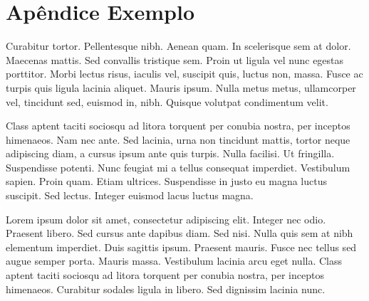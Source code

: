 %
%
% 
%
\chapter{Apêndice Exemplo}
\noindent
Curabitur tortor. Pellentesque nibh. Aenean quam. In scelerisque sem at dolor. Maecenas mattis. Sed convallis tristique sem. Proin ut ligula vel nunc egestas porttitor. Morbi lectus risus, iaculis vel, suscipit quis, luctus non, massa. Fusce ac turpis quis ligula lacinia aliquet. Mauris ipsum. Nulla metus metus, ullamcorper vel, tincidunt sed, euismod in, nibh. Quisque volutpat condimentum velit.

Class aptent taciti sociosqu ad litora torquent per conubia nostra, per inceptos himenaeos. Nam nec ante. Sed lacinia, urna non tincidunt mattis, tortor neque adipiscing diam, a cursus ipsum ante quis turpis. Nulla facilisi. Ut fringilla. Suspendisse potenti. Nunc feugiat mi a tellus consequat imperdiet. Vestibulum sapien. Proin quam. Etiam ultrices. Suspendisse in justo eu magna luctus suscipit. Sed lectus. Integer euismod lacus luctus magna.

Lorem ipsum dolor sit amet, consectetur adipiscing elit. Integer nec odio. Praesent libero. Sed cursus ante dapibus diam. Sed nisi. Nulla quis sem at nibh elementum imperdiet. Duis sagittis ipsum. Praesent mauris. Fusce nec tellus sed augue semper porta. Mauris massa. Vestibulum lacinia arcu eget nulla. Class aptent taciti sociosqu ad litora torquent per conubia nostra, per inceptos himenaeos. Curabitur sodales ligula in libero. Sed dignissim lacinia nunc.

